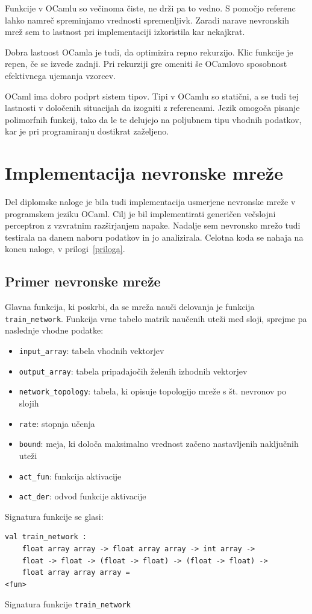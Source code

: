 \documentclass[mat1]{fmfdelo}
\begin{document}
Funkcije v OCamlu so večinoma čiste, ne drži pa to vedno. S pomočjo referenc lahko namreč spreminjamo vrednosti spremenljivk. Zaradi narave nevronskih mrež sem to lastnost pri implementaciji izkoristila kar nekajkrat.

Dobra lastnost OCamla je tudi, da optimizira repno rekurzijo. Klic funkcije je repen, če se izvede zadnji. Pri rekurziji gre omeniti še OCamlovo sposobnost efektivnega ujemanja vzorcev. 

OCaml ima dobro podprt sistem tipov. Tipi v OCamlu so statični, a se tudi tej lastnosti v določenih situacijah da izogniti z referencami. Jezik omogoča pisanje polimorfnih funkcij, tako da le te delujejo na poljubnem tipu vhodnih podatkov, kar je pri programiranju dostikrat zaželjeno. 
%
%
%
\section{Implementacija nevronske mreže}
Del diplomske naloge je bila tudi implementacija usmerjene nevronske mreže v programskem jeziku OCaml. Cilj je bil implementirati generičen večslojni perceptron z vzvratnim razširjanjem napake. Nadalje sem nevronsko mrežo tudi testirala na danem naboru podatkov in jo analizirala. Celotna koda se nahaja na koncu naloge, v prilogi~\ref{priloga}.
%
\subsection{Primer nevronske mreže}
Glavna funkcija, ki poskrbi, da se mreža nauči delovanja je funkcija  \texttt{train\_network}. Funkcija vrne tabelo matrik naučenih uteži med sloji, sprejme pa naslednje vhodne podatke:
\begin{itemize}
	\item \texttt{input\_array}: tabela vhodnih vektorjev
	\item \texttt{output\_array}: tabela pripadajočih želenih izhodnih vektorjev
	\item \texttt{network\_topology}: tabela, ki opisuje topologijo mreže s št. nevronov po slojih 
	\item \texttt{rate}: stopnja učenja 
	\item \texttt{bound}: meja, ki določa maksimalno vrednost začeno nastavljenih naključnih uteži
	\item \texttt{act\_fun}: funkcija aktivacije
	\item \texttt{act\_der}: odvod funkcije aktivacije
\end{itemize}
%
Signatura funkcije se glasi:
%
\begin{listing}[!h]
	\begin{verbatim}
val train_network :
	float array array -> float array array -> int array -> 
	float -> float -> (float -> float) -> (float -> float) -> 
	float array array array =
<fun>
	\end{verbatim} 
	\caption{Signatura funkcije \texttt{train\_network}}
	\label{signatura}
\end{listing}
\end{document}
